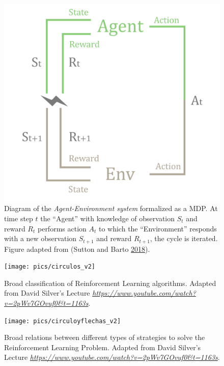 \documentclass[
  openany]{book}
\begin{document}
\begin{figure}

{\centering \includegraphics[width=0.8\linewidth]{pics/agent-env} 

}

\caption{Diagram of the \emph{Agent-Environment system} formalized as a MDP. At time step \(t\) the ``Agent'' with knowledge of observation \(S_t\) and reward \(R_t\) performs action \(A_t\) to which the ``Environment'' responds with a new observation \(S_{t+1}\) and reward \(R_{t+1}\), the cycle is iterated. Figure adapted from (Sutton and Barto \protect\hyperlink{ref-sutton2018reinforcement}{2018}).}\label{fig:env-agent-interactions}
\end{figure}



\begin{figure}

{\centering \texttt{[image: pics/circulos\_v2]} 

}

\caption{Broad classification of Reinforcement Learning algorithms. Adapted from David Silver's Lecture \emph{\url{https://www.youtube.com/watch?v=2pWv7GOvuf0\&t=1163s}}.}\label{fig:rl-algorithm-type}
\end{figure}



\begin{figure}

{\centering \texttt{[image: pics/circuloyflechas\_v2]} 

}

\caption{Broad relations between different types of strategies to solve the Reinforcement Learning Problem. Adapted from David Silver's Lecture \emph{\url{https://www.youtube.com/watch?v=2pWv7GOvuf0\&t=1163s}}.}\label{fig:rl-relations}
\end{figure}
\end{document}
